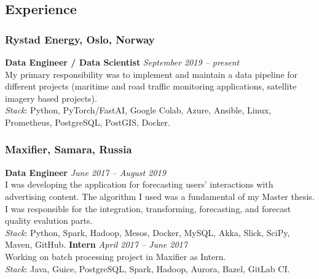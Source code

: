 \subsection*{Experience}
    \subsubsection*{Rystad Energy, Oslo, Norway}
    \textbf{Data Engineer / Data Scientist} \hfill \textit{September 2019 -- present} \\
    My primary responsibility was to implement and maintain a data pipeline for different projects 
    (maritime and road traffic monitoring applications, satellite imagery based projects). \\
    \textit{Stack}: Python, PyTorch/FastAI, Google Colab, Azure, Ansible, Linux, Prometheus, PostgreSQL, PostGIS, Docker.
    \subsubsection*{Maxifier, Samara, Russia}
    \textbf{Data Engineer} \hfill \textit{June 2017 -- August 2019} \\
    I was developing the application for forecasting users' interactions with advertising content.
    The algorithm I used was a fundamental of my Master thesis.
    I was responsible for the integration, transforming, forecasting, and forecast quality evalution parts.  \\
    \textit{Stack}: Python, Spark, Hadoop, Mesos, Docker, MySQL, Akka, Slick, SciPy, Maven, GitHub.
    \textbf{Intern} \hfill \textit{April 2017 -- June 2017} \\
    Working on batch processing project in Maxifier as Intern. \\
    \textit{Stack}: Java, Guice, PostgreSQL, Spark, Hadoop, Aurora, Bazel, GitLab CI. \\
